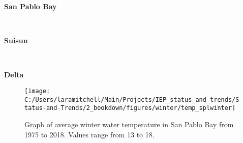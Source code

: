 \documentclass[
]{book}
\begin{document}
\begin{panel-grid}

\begin{columns-nocenter}

\begin{column800}

\textbf{San Pablo Bay}

\end{column800}

\begin{column40}

~

\end{column40}

\begin{column800}

\textbf{Suisun}

\end{column800}

\begin{column40}

~

\end{column40}

\begin{column800}

\textbf{Delta}

\end{column800}

\end{columns-nocenter}

\begin{columns-nocenter}

\begin{column800}

\begin{expand}

\begin{figure}
\texttt{[image: C:/Users/laramitchell/Main/Projects/IEP\_status\_and\_trends/Status-and-Trends/2\_bookdown/figures/winter/temp\_splwinter]} \caption{Graph of average winter water temperature in San Pablo Bay from 1975 to 2018. Values range from 13 to 18.}\label{fig:unnamed-chunk-152}
\end{figure}

\end{expand}

\end{column800}

\begin{column40}

~


\end{column40}
\end{columns-nocenter}
\end{panel-grid}
\end{document}
